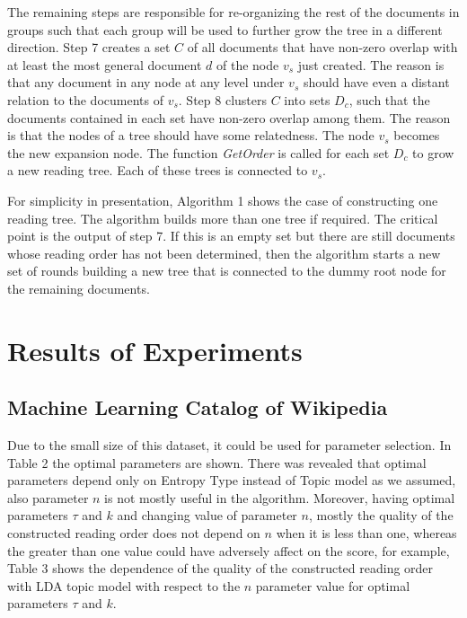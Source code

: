 \documentclass[12pt,twoside]{article}
\begin{document}
	The remaining steps are responsible for re-organizing the rest of the documents in groups such that each group will be used to further grow the tree in a different direction. Step 7 creates a set $C$ of all documents that have non-zero overlap with at least the most general document $d$ of the node $v_s$ just created. The reason is that any document in any node at any level under $v_s$ should have even a distant relation to the documents of $v_s$. Step 8 clusters $C$ into sets $D_c$, such that the documents contained in each set have non-zero overlap among them. The reason is that the nodes of a tree should have some relatedness. The node $v_s$ becomes the new expansion node. The function \textit{GetOrder} is called for each set $D_c$ to grow a new reading tree. Each of these trees is connected to $v_s$.
	
	For simplicity in presentation, Algorithm 1 shows the case of constructing one reading tree. The algorithm builds more than one tree if required. The critical point is the output of step 7. If this is an empty set but there are still documents whose reading order has not been determined, then the algorithm starts a new set of rounds building a new tree that is connected to the dummy root node for the remaining documents.
	
	\section{Results of Experiments}
	
	\subsection{Machine Learning Catalog of Wikipedia}
	Due to the small size of this dataset, it could be used for parameter selection. In Table 2 the optimal parameters are shown. There was revealed that optimal parameters depend only on Entropy Type instead of Topic model as we assumed, also parameter $n$ is not mostly useful in the algorithm. Moreover, having optimal parameters $\tau$ and $k$ and changing value of parameter $n$, mostly the quality of the constructed reading order does not depend on $n$ when it is less than one, whereas the greater than one value could have adversely affect on the score, for example, Table 3 shows the dependence of the quality of the constructed reading order with LDA topic model with respect to the $n$ parameter value for optimal parameters $\tau$ and $k$. 
	
\end{document}
